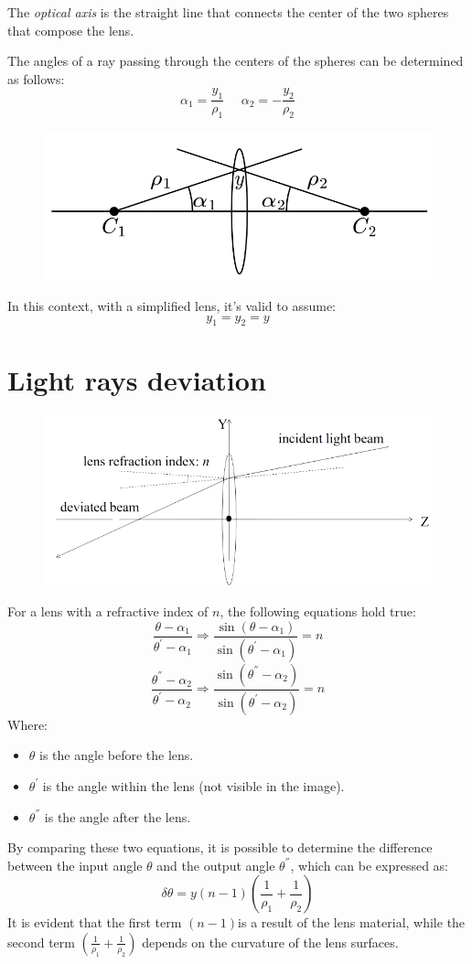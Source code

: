 \documentclass[12pt, a4paper]{report}
\begin{document}
    \begin{definition}
        The \emph{optical axis} is the straight line that connects the center of the two spheres that compose the lens.
    \end{definition}
    The angles of a ray passing through the centers of the spheres can be determined as follows:
    \[\alpha_1=\dfrac{y_1}{\rho_1} \:\:\:\:\:\: \alpha_2=-\dfrac{y_2}{\rho_2}\]
    \begin{figure}[H]
        \centering
        \includegraphics[width=0.4\linewidth]{images/y.png}
    \end{figure}
    In this context, with a simplified lens, it's valid to assume:
    \[y_1=y_2=y\]
    
    \section{Light rays deviation}
    \begin{figure}[H]
        \centering
        \includegraphics[width=0.4\linewidth]{images/ray.png}
    \end{figure}
    For a lens with a refractive index of $n$, the following equations hold true:
    \[\dfrac{\theta-\alpha_1}{\theta^{'}-\alpha_1} \Rightarrow \dfrac{\sin{(\theta-\alpha_1)}}{\sin{(\theta^{'}-\alpha_1)}}=n\]
    \[\dfrac{\theta^{''}-\alpha_2}{\theta^{'}-\alpha_2} \Rightarrow \dfrac{\sin{(\theta^{''}-\alpha_2)}}{\sin{(\theta^{'}-\alpha_2)}}=n\]
    Where:
    \begin{itemize}
        \item $\theta$ is the angle before the lens. 
        \item $\theta^{'}$ is the angle within the lens (not visible in the image). 
        \item $\theta^{''}$ is the angle after the lens.
    \end{itemize}
    By comparing these two equations, it is possible to determine the difference between the input angle $\theta$ and the output angle $\theta^{''}$, which can be expressed as:
    \[\delta \theta=y(n-1)\left( \dfrac{1}{\rho_1} + \dfrac{1}{\rho_2}\right)\]
    It is evident that the first term $(n-1)$is a result of the lens material, while the second term $\left( \frac{1}{\rho_1} + \frac{1}{\rho_2}\right)$ depends on the curvature of the lens surfaces.
\end{document}
